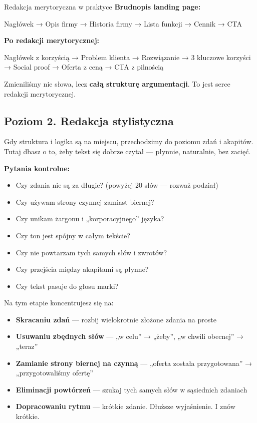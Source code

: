 \documentclass[
  12pt,
  a4paper,
  twoside,
  openright,
  12pt,
  DIV=12,
  BCOR=12mm]{scrbook}
\providecommand{\tightlist}{%
  \setlength{\itemsep}{0pt}\setlength{\parskip}{0pt}}\usepackage{longtable,booktabs,array}
\begin{document}
\begin{przyklad}{Redakcja merytoryczna w praktyce}
\textbf{Brudnopis landing page:}

Nagłówek → Opis firmy → Historia firmy → Lista funkcji → Cennik → CTA

\textbf{Po redakcji merytorycznej:}

Nagłówek z korzyścią → Problem klienta → Rozwiązanie → 3 kluczowe korzyści → Social proof → Oferta z ceną → CTA z pilnością

Zmieniliśmy nie słowa, lecz \textbf{całą strukturę argumentacji}. To jest serce redakcji merytorycznej.
\end{przyklad}

\subsection{Poziom 2. Redakcja
stylistyczna}\label{poziom-2.-redakcja-stylistyczna}

Gdy struktura i logika są na miejscu, przechodzimy do poziomu zdań i
akapitów. Tutaj dbasz o to, żeby tekst się dobrze czytał --- płynnie,
naturalnie, bez zacięć.

\textbf{Pytania kontrolne:}

\begin{itemize}
\tightlist
\item
  Czy zdania nie są za długie? (powyżej 20 słów --- rozważ podział)
\item
  Czy używam strony czynnej zamiast biernej?
\item
  Czy unikam żargonu i „korporacyjnego'' języka?
\item
  Czy ton jest spójny w całym tekście?
\item
  Czy nie powtarzam tych samych słów i zwrotów?
\item
  Czy przejścia między akapitami są płynne?
\item
  Czy tekst pasuje do głosu marki?
\end{itemize}

Na tym etapie koncentrujesz się na:

\begin{itemize}
\tightlist
\item
  \textbf{Skracaniu zdań} --- rozbij wielokrotnie złożone zdania na
  proste
\item
  \textbf{Usuwaniu zbędnych słów} --- „w celu'' → „żeby'', „w chwili
  obecnej'' → „teraz''
\item
  \textbf{Zamianie strony biernej na czynną} --- „oferta została
  przygotowana'' → „przygotowaliśmy ofertę''
\item
  \textbf{Eliminacji powtórzeń} --- szukaj tych samych słów w sąsiednich
  zdaniach
\item
  \textbf{Dopracowaniu rytmu} --- krótkie zdanie. Dłuższe wyjaśnienie. I
  znów krótkie.
\end{itemize}
\end{document}
